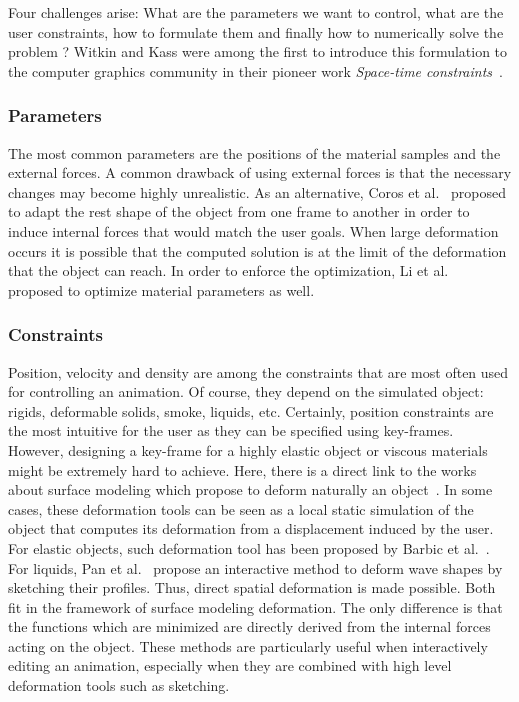 Four challenges arise: What are the parameters we want to control, what are the user constraints, how to formulate them and finally how to numerically solve the problem ?
Witkin and Kass were among the first to introduce this formulation to the computer graphics community in their pioneer work \emph{Space-time constraints}~\cite{Witkin1988}.

\subsubsection{Parameters}
The most common parameters are the positions of the material samples and the external forces.
A common drawback of using external forces is that the necessary changes may become highly unrealistic.
As an alternative, Coros et al.~\cite{Coros2012} proposed to adapt the rest shape of the object from one frame to another in order to induce internal forces that would match the user goals.
When large deformation occurs it is possible that the computed solution is at the limit of the deformation that the object can reach. In order to enforce the optimization, Li et al.~\cite{Li2014} proposed to optimize material parameters as well. 

\subsubsection{Constraints}
Position, velocity and density are among the constraints that are most often used for controlling an animation. 
Of course, they depend on the simulated object: rigids, deformable solids, smoke, liquids, etc. 
Certainly, position constraints are the most intuitive for the user as they can be specified using key-frames. 
However, designing a key-frame for a highly elastic object or viscous materials might be extremely hard to achieve. 
Here, there is a direct link to the works about surface modeling which propose to deform naturally an object~\cite{Sorkine2007, Hildebrandt2011}. 
In some cases, these deformation tools can be seen as a local static simulation of the object that computes its deformation from a displacement induced by the user. 
For elastic objects, such deformation tool has been proposed by Barbic et al.~\cite{Barbic2012}.
For liquids, Pan et al.~\cite{Pan2013} propose an interactive method to deform wave shapes by sketching their profiles. 
Thus, direct spatial deformation is made possible. 
Both fit in the framework of surface modeling deformation. 
The only difference is that the functions which are minimized are directly derived from the internal forces acting on the object. 
These methods are particularly useful when interactively editing an animation, especially when they are combined with high level deformation tools such as sketching.

